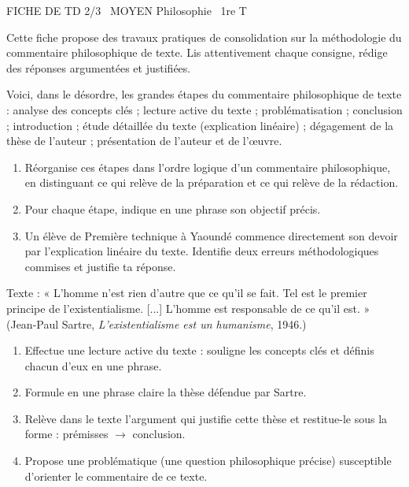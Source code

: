\documentclass[11pt]{article}
\begin{document}
\begin{tcolorbox}[enhanced,colback=popink,colframe=popink,arc=10pt,boxrule=0pt,left=12pt,right=12pt,top=9pt,bottom=9pt]
{\color{white}\popxbold\small FICHE DE TD 2/3 \textbullet\ MOYEN \hfill Philosophie \textbullet\ 1re T\par}
\end{tcolorbox}
\vspace{4pt}
Cette fiche propose des travaux pratiques de consolidation sur la méthodologie du commentaire philosophique de texte. Lis attentivement chaque consigne, rédige des réponses argumentées et justifiées.

\begin{exercice}
Voici, dans le désordre, les grandes étapes du commentaire philosophique de texte : analyse des concepts clés ; lecture active du texte ; problématisation ; conclusion ; introduction ; étude détaillée du texte (explication linéaire) ; dégagement de la thèse de l'auteur ; présentation de l'auteur et de l'œuvre.
\begin{enumerate}
\item Réorganise ces étapes dans l'ordre logique d'un commentaire philosophique, en distinguant ce qui relève de la préparation et ce qui relève de la rédaction.
\item Pour chaque étape, indique en une phrase son objectif précis.
\item Un élève de Première technique à Yaoundé commence directement son devoir par l'explication linéaire du texte. Identifie deux erreurs méthodologiques commises et justifie ta réponse.
\end{enumerate}
\end{exercice}

\begin{exercice}
Texte : « L'homme n'est rien d'autre que ce qu'il se fait. Tel est le premier principe de l'existentialisme. [...] L'homme est responsable de ce qu'il est. » (Jean-Paul Sartre, \emph{L'existentialisme est un humanisme}, 1946.)
\begin{enumerate}
\item Effectue une lecture active du texte : souligne les concepts clés et définis chacun d'eux en une phrase.
\item Formule en une phrase claire la thèse défendue par Sartre.
\item Relève dans le texte l'argument qui justifie cette thèse et restitue-le sous la forme : prémisses $\rightarrow$ conclusion.
\item Propose une problématique (une question philosophique précise) susceptible d'orienter le commentaire de ce texte.
\end{enumerate}
\end{exercice}
\end{document}
